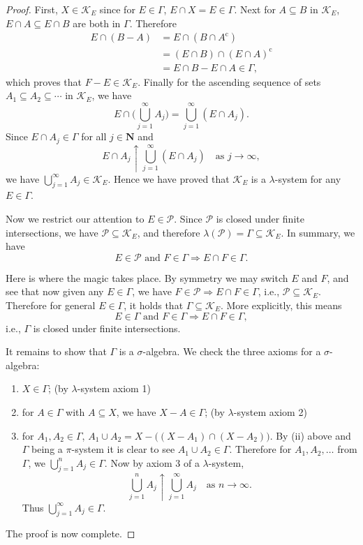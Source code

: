 \begin{proof}
First, $X\in\mathcal K_{E}$ since for $E\in\Gamma$, $E\cap X=E\in\Gamma$.
Next for $A\subseteq B$ in $\mathcal K_{E}$, $E\cap A\subseteq E\cap B$
are both in $\Gamma$. Therefore 
\begin{align*}
E\cap(B-A) & =E\cap(B\cap A^{\mathrm{c}})\\
& =(E\cap B)\cap(E\cap A)^{\mathrm{c}}\\
& =E\cap B-E\cap A\in\Gamma,
\end{align*}
which proves that $F-E\in\mathcal K_{E}$. Finally for the ascending sequence of sets $A_{1}\subseteq A_{2}\subseteq\cdots$ in $\mathcal K_{E}$, we have 
\[
    E\cap\biggl(\bigcup_{j=1}^\infty A_{j}\biggr)=\bigcup_{j=1}^\infty (E\cap A_{j}).
\]
Since $E\cap A_{j}\in\Gamma$ for all $j\in\mathbf{N}$ and \[E\cap A_{j}\uparrow\bigcup_{j=1}^\infty (E\cap A_{j})\quad \text{as $j\to\infty$},\] we have $\bigcup_{j=1}^\infty A_{j}\in\mathcal K_{E}$.
Hence we have proved that $\mathcal K_{E}$ is a $\lambda$-system for any $E\in\Gamma$.

Now we restrict our attention to $E\in\mathcal{P}$. Since $\mathcal{P}$ is closed under finite intersections, we have $\mathcal{P}\subseteq\mathcal K_{E}$, and therefore $\lambda(\mathcal P) = \Gamma\subseteq\mathcal K_{E}$. In summary, we have  
\[
E\in\mathcal{P}\text{ and }F\in\Gamma\Rightarrow E\cap F\in\Gamma.
\]

Here is where the magic takes place. By symmetry we may switch $E$ and $F$, and see that now given any $E\in\Gamma$, we have $F\in\mathcal{P}\Rightarrow E\cap F\in\Gamma$, i.e., $\mathcal{P}\subseteq\mathcal K_{E}$. Therefore for general $E\in\Gamma$, it holds that $\Gamma\subseteq\mathcal K_{E}$. More explicitly, this means 
\[
E\in\Gamma\text{ and }F\in\Gamma\Rightarrow E\cap F\in\Gamma,
\]
i.e., $\Gamma$ is closed under finite intersections.

It remains to show that $\Gamma$ is a $\sigma$-algebra. We check the three axioms for a $\sigma$-algebra:
\begin{enumerate}[label=(\roman*)]
\item $X\in\Gamma$; (by $\lambda$-system axiom 1)
\item for $A\in\Gamma$ with $A\subseteq X$, we have $X -A\in\Gamma$;
(by $\lambda$-system axiom 2)
\item for $A_{1},A_{2}\in\Gamma$, $A_{1}\cup A_{2}=X-\bigl((X-A_{1})\cap(X-A_{2})\bigr)$.
By (ii) above and $\Gamma$ being a $\pi$-system it is clear to see $A_{1}\cup A_{2}\in\Gamma$. Therefore for $A_{1},A_{2},\dotsc$ from $\Gamma$, we $\bigcup_{j=1}^{n}A_{j}\in\Gamma$. Now by axiom 3 of a $\lambda$-system, 
\[
\bigcup_{j=1}^{n}A_{j}\uparrow\bigcup_{j=1}^{\infty}A_{j}\quad\text{as }n\to\infty.
\]
Thus $\bigcup_{j=1}^{\infty}A_{j}\in\Gamma$.
\end{enumerate}
The proof is now complete.
\end{proof}

